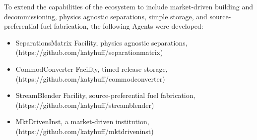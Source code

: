 

To extend the capabilities of the \Cyclus ecosystem to include market-driven 
building and decommissioning, physics agnostic separations, simple storage, and 
source-preferential fuel fabrication, the following Agents were developed:

\begin{itemize}
\item SeparationsMatrix Facility, physics agnostic separations, (https://github.com/katyhuff/separationmatrix)
\item CommodConverter Facility, timed-release storage, (https://github.com/katyhuff/commodconverter)
\item StreamBlender Facility, source-preferential fuel fabrication, (https://github.com/katyhuff/streamblender)
\item MktDrivenInst, a market-driven institution, (https://github.com/katyhuff/mktdriveninst)
\end{itemize}

